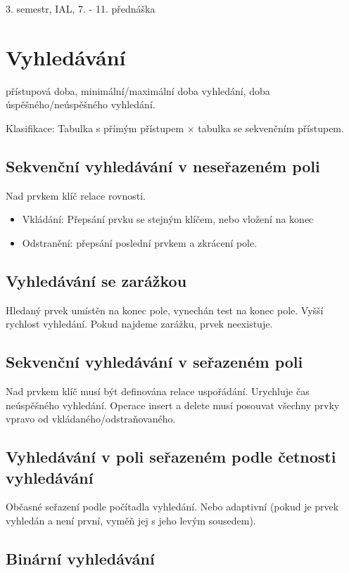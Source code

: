 \documentclass[a4paper, 11pt]{report}
\begin{document}
3. semestr, IAL, 7. - 11. přednáška

\section{Vyhledávání}

přístupová doba, minimální/maximální doba vyhledání, doba úspěšného/neúspěšného vyhledání.

Klasifikace: Tabulka s přímým přístupem $\times$ tabulka se sekvenčním přístupem.

\subsection{Sekvenční vyhledávání v neseřazeném poli}

Nad prvkem klíč relace rovnosti.

\begin{itemize}
	\item Vkládání: Přepsání prvku se stejným klíčem, nebo vložení na konec
	\item Odstranění: přepsání poslední prvkem a zkrácení pole.
\end{itemize}

\subsection{Vyhledávání se zarážkou}

Hledaný prvek umístěn na konec pole, vynechán test na konec pole. Vyšší rychlost vyhledání. Pokud najdeme zarážku, prvek neexistuje.

\subsection{Sekvenční vyhledávání v seřazeném poli}

Nad prvkem klíč musí být definována relace uspořádání. Urychluje čas neúspěšného vyhledání. Operace insert a delete musí posouvat všechny prvky vpravo od vkládaného/odstraňovaného.

\subsection{Vyhledávání v poli seřazeném podle četnosti vyhledávání}

Občasné seřazení podle počítadla vyhledání. Nebo adaptivní (pokud je prvek vyhledán a není první, vyměň jej s jeho levým sousedem).

\subsection{Binární vyhledávání}
\end{document}

